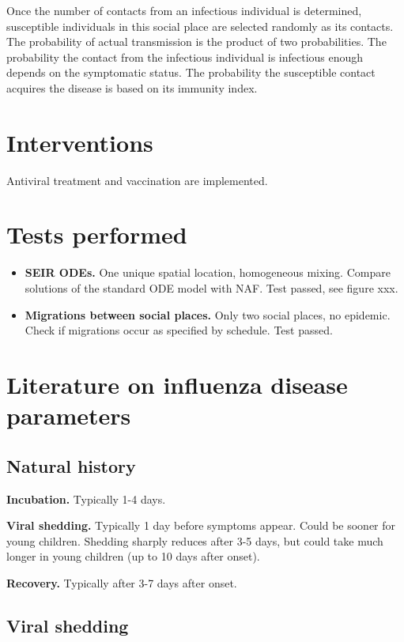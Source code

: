 \documentclass[11pt, onecolumn]{article}
\newcommand{\naf}{\textsf{NAF}\xspace}
\begin{document}
Once the number of contacts from an infectious individual is determined, susceptible individuals in this social place are selected randomly as its contacts. The probability of actual transmission is the product of two probabilities. The probability the contact from the infectious individual is infectious enough depends on the symptomatic status. The probability the susceptible contact acquires the disease is based on its immunity index. 


\section{Interventions}

Antiviral treatment and vaccination are implemented. 






\section{Tests performed}

\begin{itemize}
\item \textbf{SEIR ODEs.} One unique spatial location, homogeneous mixing. Compare solutions of the standard ODE model with \naf. Test passed, see figure xxx.
\item \textbf{Migrations between social places.} Only two social places, no epidemic. Check if migrations occur as specified by schedule. Test passed. 
\end{itemize}


\section{Literature on influenza disease parameters}

\subsection{Natural history}

\textbf{Incubation.} Typically 1-4 days.

\textbf{Viral shedding.} Typically 1 day before symptoms appear. Could be sooner for young children. Shedding sharply reduces after 3-5 days, but could take much longer in young children (up to 10 days after onset). 

\textbf{Recovery.} Typically after 3-7 days after onset.


\subsection{Viral shedding}
\end{document}
